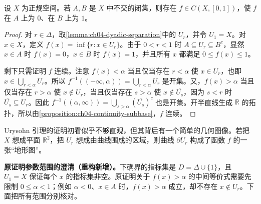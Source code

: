 \documentclass[../../main.tex]{subfiles}%
\begin{document}
\begin{lemma}[Urysohn 引理]\label{lemma:ch04-urysohn}
设 $X$ 为正规空间。若 $A,B$ 是 $X$ 中不交的闭集，则存在 $f\in C(X,[0,1])$，使 $f$ 在 $A$ 上为 $0$、在 $B$ 上为 $1$。
\end{lemma}
\begin{proof}
对 $r\in\Delta$，取\cref{lemma:ch04-dyadic-separation}中的 $U_r$，并令 $U_1=X$。对 $x\in X$，定义 $f(x)=\inf\{r:x\in U_r\}$。由于 $0<r<1$ 时 $A\subseteq U_r\subseteq B^c$，显然 $x\in A$ 时 $f(x)=0$，$x\in B$ 时 $f(x)=1$，并且所有 $x$ 都满足 $0\le f(x)\le1$。

剩下只需证明 $f$ 连续。注意 $f(x)<\alpha$ 当且仅当存在 $r<\alpha$ 使 $x\in U_r$，也即 $x\in\bigcup_{r<\alpha}U_r$。所以 $f^{-1}((-\infty,\alpha))=\bigcup_{r<\alpha}U_r$ 是开集。又，$f(x)>\alpha$ 当且仅当存在 $r>\alpha$ 使 $x\notin U_r$，当且仅当存在 $s>\alpha$ 使 $x\notin\overline{U_s}$，因为 $s<r$ 时 $\overline{U_s}\subseteq U_r$。因此 $f^{-1}((\alpha,\infty))=\bigcup_{s>\alpha}(\overline{U_s})^c$ 也是开集。开半直线生成 $\mathbb R$ 的拓扑，所以由\cref{proposition:ch04-continuity-subbase}，$f$ 连续。
\end{proof}
\begin{remark}
Urysohn 引理的证明初看似乎不够直观，但其背后有一个简单的几何图像。若把 $X$ 想成平面 $\mathbb R^2$，把 $U_r$ 想成由曲线围成的区域，则曲线 $\partial U_r$ 构成了函数 $f$ 的一张“地形图”。
\end{remark}
\begin{remark}
\textbf{原证明参数范围的澄清（重构新增）。}下确界的指标集是 $D=\Delta\cup\{1\}$，且 $U_1=X$ 保证每个 $x$ 的指标集非空。原证明关于 $f(x)>\alpha$ 的中间等价式需要先限制 $0\le\alpha<1$；例如 $\alpha<0$、$x\in A$ 时，$f(x)>\alpha$ 成立，却不存在 $x\notin U_r$。下面把所有范围分别核对。
\end{remark}
\end{document}

